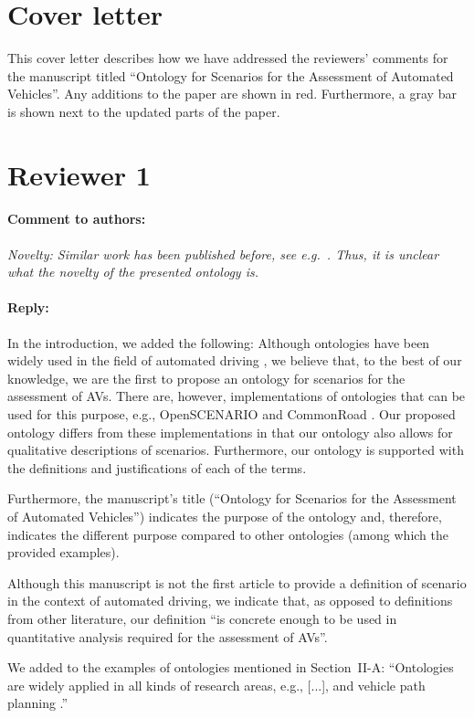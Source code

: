 \documentclass[10pt,final,a4paper,oneside,onecolumn]{article}
\renewcommand{\cite}[1]{\parencite{#1}}
\newcommand{\toauthor}{\paragraph*{Comment to authors:} \itshape}
\newcommand{\fromauthor}{\paragraph*{Reply:} \normalfont}
\newcommand{\cstart}{\cbstart\color{red}}
\newcommand{\cend}{\cbend\color{black}}
\begin{document}
	
\section*{Cover letter}

This cover letter describes how we have addressed the reviewers' comments for the manuscript titled ``Ontology for Scenarios for the Assessment of Automated Vehicles''. Any additions to the paper are shown in \color{red}red\color{black}. Furthermore, a gray bar is shown next to the updated parts of the paper.
	
\section*{Reviewer 1}

\toauthor Novelty: Similar work has been published before, see e.g.\ \cite{provine2004ontology, morignot2013ontology, schlenoff2003using, zhao2015core}. Thus, it is unclear what the novelty of the presented ontology is.

\fromauthor In the introduction, we added the following: \cstart Although ontologies have been widely used in the field of automated driving \cite{provine2004ontology, morignot2013ontology, schlenoff2003using, zhao2015core, maiti2017conceptualization, benvenuti2017ontologybased, bagschik2017ontology}, we believe that, to the best of our knowledge, we are the first to propose an ontology for scenarios for the assessment of AVs. There are, however, implementations of ontologies that can be used for this purpose, e.g., OpenSCENARIO \cite{openscenario} and CommonRoad \cite{althoff2017CommonRoad}. Our proposed ontology differs from these implementations in that our ontology also allows for qualitative descriptions of scenarios. Furthermore, our ontology is supported with the definitions and justifications of each of the terms.\cend

Furthermore, the manuscript's title (``Ontology for Scenarios for the Assessment of Automated Vehicles'') indicates the purpose of the ontology and, therefore, indicates the different purpose compared to other ontologies (among which the provided examples).

Although this manuscript is not the first article to provide a definition of scenario in the context of automated driving, we indicate that, as opposed to definitions from other literature, our definition ``is concrete enough to be used in quantitative analysis required for the assessment of AVs''.

We added \cite{provine2004ontology, schlenoff2003using} to the examples of ontologies mentioned in Section~II-A: ``Ontologies are widely applied in all kinds of research areas, e.g., [...], \cstart and vehicle path planning \cite{provine2004ontology, schlenoff2003using}.\cend''
\end{document}
